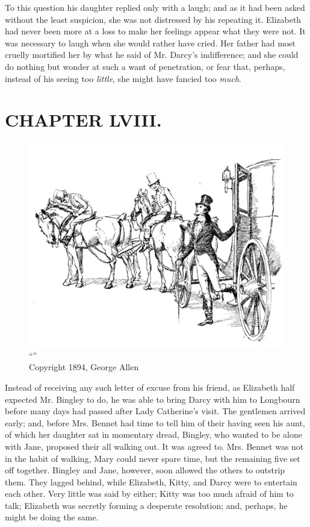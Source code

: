 To this question his daughter replied only with a laugh; and as it had been asked without the least suspicion, she was not distressed by his repeating it. Elizabeth had never been more at a loss to make her feelings appear what they were not. It was necessary to laugh when she would rather have cried. Her father had most cruelly mortified her by what he said of Mr. Darcy's indifference; and she could do nothing but wonder at such a want of penetration, or fear that, perhaps, instead of his seeing too \textit{little}, she might have fancied too \textit{much}.



\chapter{CHAPTER LVIII.}

\begin{figure}[htbp]
    \centering
    \includegraphics[width=\textwidth]{illustrations/i_031.jpg}
    \caption{“”\\ Copyright 1894, George Allen}
    \label{fig:image}
\end{figure}


Instead of receiving any such letter of excuse from his friend, as Elizabeth half expected Mr. Bingley to do, he was able to bring Darcy with him to Longbourn before many days had passed after Lady Catherine's visit. The gentlemen arrived early; and, before Mrs. Bennet had time to tell him of their having seen his aunt, of which her daughter sat in momentary dread, Bingley, who wanted to be alone with Jane, proposed their all walking out. It was agreed to. Mrs. Bennet was not in the habit of walking, Mary could never spare time, but the remaining five set off together. Bingley and Jane, however, soon allowed the others to outstrip them. They lagged behind, while Elizabeth, Kitty, and Darcy were to entertain each other. Very little was said by either; Kitty was too much afraid of him to talk; Elizabeth was secretly forming a desperate resolution; and, perhaps, he might be doing the same.

